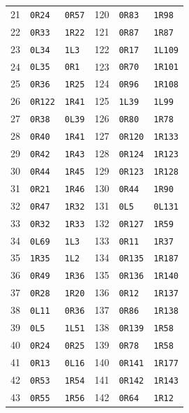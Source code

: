 \begin{longtable}{@{}r ll @{\qquad} r ll@{}}
21 & \texttt{0R24} & \texttt{0R57} & 120 & \texttt{0R83} & \texttt{1R98} \\
22 & \texttt{0R33} & \texttt{1R22} & 121 & \texttt{0R87} & \texttt{1R87} \\
23 & \texttt{0L34} & \texttt{1L3} & 122 & \texttt{0R17} & \texttt{1L109} \\
24 & \texttt{0L35} & \texttt{0R1} & 123 & \texttt{0R70} & \texttt{1R101} \\
25 & \texttt{0R36} & \texttt{1R25} & 124 & \texttt{0R96} & \texttt{1R108} \\
26 & \texttt{0R122} & \texttt{1R41} & 125 & \texttt{1L39} & \texttt{1L99} \\
27 & \texttt{0R38} & \texttt{0L39} & 126 & \texttt{0R80} & \texttt{1R78} \\
28 & \texttt{0R40} & \texttt{1R41} & 127 & \texttt{0R120} & \texttt{1R133} \\
29 & \texttt{0R42} & \texttt{1R43} & 128 & \texttt{0R124} & \texttt{1R123} \\
30 & \texttt{0R44} & \texttt{1R45} & 129 & \texttt{0R123} & \texttt{1R128} \\
31 & \texttt{0R21} & \texttt{1R46} & 130 & \texttt{0R44} & \texttt{1R90} \\
32 & \texttt{0R47} & \texttt{1R32} & 131 & \texttt{0L5} & \texttt{0L131} \\
33 & \texttt{0R32} & \texttt{1R33} & 132 & \texttt{0R127} & \texttt{1R59} \\
34 & \texttt{0L69} & \texttt{1L3} & 133 & \texttt{0R11} & \texttt{1R37} \\
35 & \texttt{1R35} & \texttt{1L2} & 134 & \texttt{0R135} & \texttt{1R187} \\
36 & \texttt{0R49} & \texttt{1R36} & 135 & \texttt{0R136} & \texttt{1R140} \\
37 & \texttt{0R28} & \texttt{1R20} & 136 & \texttt{0R12} & \texttt{1R137} \\
38 & \texttt{0L11} & \texttt{0R36} & 137 & \texttt{0R86} & \texttt{1R138} \\
39 & \texttt{0L5} & \texttt{1L51} & 138 & \texttt{0R139} & \texttt{1R58} \\
40 & \texttt{0R24} & \texttt{0R25} & 139 & \texttt{0R78} & \texttt{1R58} \\
41 & \texttt{0R13} & \texttt{0L16} & 140 & \texttt{0R141} & \texttt{1R177} \\
42 & \texttt{0R53} & \texttt{1R54} & 141 & \texttt{0R142} & \texttt{1R143} \\
43 & \texttt{0R55} & \texttt{1R56} & 142 & \texttt{0R64} & \texttt{1R12} \\

\end{longtable}
